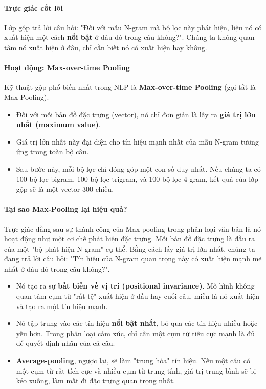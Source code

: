 \paragraph{Trực giác cốt lõi}
Lớp gộp trả lời câu hỏi: "Đối với mẫu N-gram mà bộ lọc này phát hiện, liệu nó có xuất hiện một cách \textbf{nổi bật} ở đâu đó trong câu không?". Chúng ta không quan tâm nó xuất hiện ở đâu, chỉ cần biết nó có xuất hiện hay không.

\paragraph{Hoạt động: Max-over-time Pooling}
Kỹ thuật gộp phổ biến nhất trong NLP là \textbf{Max-over-time Pooling} (gọi tắt là Max-Pooling).
\begin{itemize}
    \item Đối với mỗi bản đồ đặc trưng (vector), nó chỉ đơn giản là lấy ra \textbf{giá trị lớn nhất (maximum value)}.
    \item Giá trị lớn nhất này đại diện cho tín hiệu mạnh nhất của mẫu N-gram tương ứng trong toàn bộ câu.
    \item Sau bước này, mỗi bộ lọc chỉ đóng góp một con số duy nhất. Nếu chúng ta có 100 bộ lọc bigram, 100 bộ lọc trigram, và 100 bộ lọc 4-gram, kết quả của lớp gộp sẽ là một vector 300 chiều.
\end{itemize}
\paragraph{Tại sao Max-Pooling lại hiệu quả?}
Trực giác đằng sau sự thành công của Max-pooling trong phân loại văn bản là nó hoạt động như một cơ chế phát hiện đặc trưng. Mỗi bản đồ đặc trưng là đầu ra của một "bộ phát hiện N-gram" cụ thể. Bằng cách lấy giá trị lớn nhất, chúng ta đang trả lời câu hỏi: "Tín hiệu của N-gram quan trọng này có xuất hiện mạnh mẽ nhất ở đâu đó trong câu không?".
\begin{itemize}
    \item Nó tạo ra sự \textbf{bất biến về vị trí (positional invariance)}. Mô hình không quan tâm cụm từ "rất tệ" xuất hiện ở đầu hay cuối câu, miễn là nó xuất hiện và tạo ra một tín hiệu mạnh.
    \item Nó tập trung vào các tín hiệu \textbf{nổi bật nhất}, bỏ qua các tín hiệu nhiễu hoặc yếu hơn. Trong phân loại cảm xúc, chỉ cần một cụm từ tiêu cực mạnh là đủ để quyết định nhãn của cả câu.
    \item \textbf{Average-pooling}, ngược lại, sẽ làm "trung hòa" tín hiệu. Nếu một câu có một cụm từ rất tích cực và nhiều cụm từ trung tính, giá trị trung bình sẽ bị kéo xuống, làm mất đi đặc trưng quan trọng nhất.
\end{itemize}
